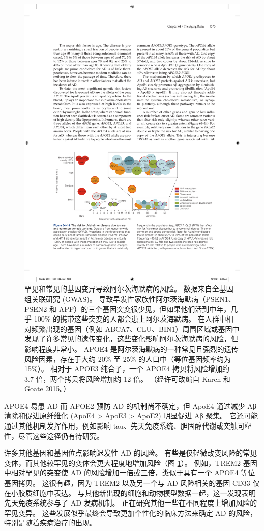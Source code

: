 \begin{figure}[htbp]
	\centering
	\includegraphics[width=0.9\linewidth]{chap64/fig_64_14}
	\caption{罕见和常见的基因变异导致阿尔茨海默病的风险。 数据来自全基因组关联研究 (GWAS)。 导致早发性家族性阿尔茨海默病（PSEN1、PSEN2 和 APP）的三个基因突变很少见，但如果他们活到中年，几乎 100\% 的携带这些突变的人都会患上阿尔茨海默病。 在人群中相对频繁出现的基因（例如 ABCA7、CLU、BIN1）周围区域或基因中发现了许多常见的遗传变化，这些变化影响阿尔茨海默病的风险，但影响程度非常小。 APOE4 是阿尔茨海默病的一种常见且强烈的遗传风险因素，存在于大约 20\% 至 25\% 的人口中（等位基因频率约为 15\%）。 相对于 APOE3 纯合子，一个 APOE4 拷贝将风险增加约 3.7 倍，两个拷贝将风险增加约 12 倍。 （经许可改编自 Karch 和 Goate 2015。）}
	\label{fig:64_14}
\end{figure}

APOE4 易患 AD 而 APOE2 预防 AD 的机制尚不确定，但 ApoE4 通过减少 Aβ 清除和促进原纤维化 (ApoE4 > ApoE3 > ApoE2) 明显促进 Aβ 聚集。 它还可能通过其他机制发挥作用，例如影响 tau、先天免疫系统、胆固醇代谢或突触可塑性，尽管这些途径仍有待研究。

许多其他基因和基因位点影响迟发性 AD 的风险。 有些是仅轻微改变风险的常见变体，而其他较罕见的变体会更大程度地增加风险（图 \ref{fig:64_14}）。 例如，TREM2 基因中相对罕见的突变使 AD 的风险增加一倍或三倍，类似于具有一个 APOE4 等位基因拷贝。 这很有趣，因为 TREM2 以及另一个与 AD 风险相关的基因 CD33 仅在小胶质细胞中表达。 与其他新出现的细胞和动物模型数据一起，这一发现表明先天免疫系统参与了 AD 发病机制。 正在研究其他一些在不同程度上增加风险的罕见变异。 这些发展似乎最终会导致更加个性化的临床方法来确定 AD 的风险，特别是随着疾病治疗的出现。


